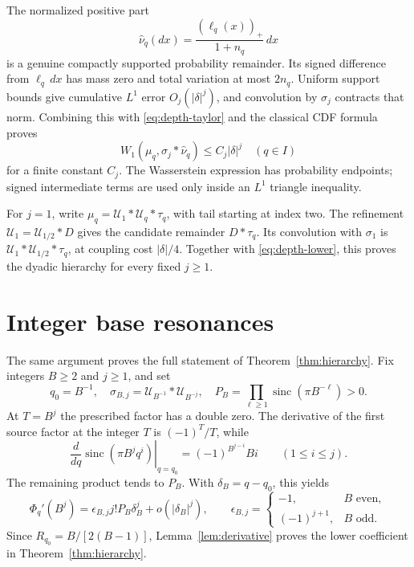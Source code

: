 \documentclass[11pt,letterpaper]{article}
\theoremstyle{remark}\newtheorem{remark}[theorem]{Remark}
\newcommand{\Un}{\mathcal U}\newcommand{\Law}{\mathcal L}
\newcommand{\sinc}{\operatorname{sinc}}
\begin{document}
The normalized positive part
\[
\widehat\nu_q(dx)=\frac{(\ell_q(x))_+}{1+n_q}\,dx
\]
is a genuine compactly supported probability remainder. Its signed difference from $\ell_q\,dx$ has mass zero and total variation at most $2n_q$. Uniform support bounds give cumulative $L^1$ error $O_j(|\delta|^j)$, and convolution by $\sigma_j$ contracts that norm. Combining this with \eqref{eq:depth-taylor} and the classical CDF formula proves
\[
W_1(\mu_q,\sigma_j*\widehat\nu_q)\le C_j|\delta|^j
\quad(q\in I)
\]
for a finite constant $C_j$. The Wasserstein expression has probability endpoints; signed intermediate terms are used only inside an $L^1$ triangle inequality.

For $j=1$, write $\mu_q=\Un_1*\Un_q*\tau_q$, with tail starting at index two. The refinement $\Un_1=\Un_{1/2}*D$ gives the candidate remainder $D*\tau_q$. Its convolution with $\sigma_1$ is $\Un_1*\Un_{1/2}*\tau_q$, at coupling cost $|\delta|/4$. Together with \eqref{eq:depth-lower}, this proves the dyadic hierarchy for every fixed $j\ge1$.

\section{Integer base resonances}\label{sec:integer-base}

The same argument proves the full statement of Theorem~\ref{thm:hierarchy}. Fix integers $B\ge2$ and $j\ge1$, and set
\[
q_0=B^{-1},\quad \sigma_{B,j}=\Un_{B^{-1}}*\Un_{B^{-j}},\quad
P_B=\prod_{\ell\ge1}\sinc(\pi B^{-\ell})>0.
\]
At $T=B^j$ the prescribed factor has a double zero. The derivative of the first source factor at the integer $T$ is $(-1)^T/T$, while
\[
\left.\frac{d}{dq}\sinc(\pi B^jq^i)\right|_{q=q_0}
=(-1)^{B^{j-i}}Bi\qquad(1\le i\le j).
\]
The remaining product tends to $P_B$. With $\delta_B=q-q_0$, this yields
\begin{equation}\label{eq:base-defect}
\Phi_q'(B^j)=\epsilon_{B,j}j!P_B\delta_B^j+o(|\delta_B|^j),\qquad
\epsilon_{B,j}=\begin{cases}-1,&B\text{ even},\\(-1)^{j+1},&B\text{ odd}.
\end{cases}
\end{equation}
Since $R_{q_0}=B/[2(B-1)]$, Lemma~\ref{lem:derivative} proves the lower coefficient in Theorem~\ref{thm:hierarchy}.
\end{document}
